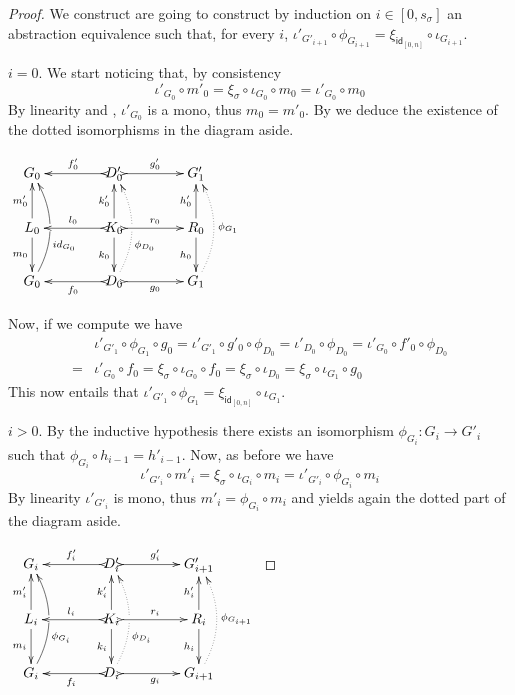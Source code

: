 \documentclass[a4paper,UKenglish,cleveref,pdftex,thm-restate,numberwithinsect,anonymous]{lipics}
\newcommand{\id}[1]{\mathsf{id}_{#1}}
\def\G{\textbf {\textup{G}}}
\begin{document}
\begin{proof}We construct are going to construct by induction on $i\in [0,s_\sigma]$ an abstraction equivalence such that, for every $i$, $\iota'_{G'_{i+1}}\circ \phi_{G_{i+1}}=\xi_{\id{[0,n]}}\circ \iota_{G_{i+1}}$.
	
	\smallskip \noindent \parbox{8.2cm}{$i=0$. We start noticing that, by consistency
		\[\iota'_{G_0}\circ m'_0=\xi_\sigma \circ \iota_{G_0}\circ m_0=\iota'_{G_0}\circ m_0\]
		By linearity and , $\iota'_{G_0}$ is a mono, thus $m_0=m'_0$. By   we deduce the existence of the dotted isomorphisms in the diagram aside.} \parbox{4cm}{\vspace{0ex}$\xymatrix@C=40pt{G_0&D'_0 \ar@{>->}[r]^{g'_0}
			\ar@{>->}[l]_{f'_0}&G'_{1}\\ L_0 \ar[u]^{m'_0} \ar[d]_{m_0}& K_0
			\ar[u]^{k'_0} \ar[d]_{k_0} \ar@{>->}[r]^{r_0} \ar@{>->}[l]_{l_0}
			&R_0\ar[u]^{h'_0} \ar[d]_{h_0}\\G_0
			\ar@/_.45cm/[uu]_(.35){\id{G_0}}|\hole& D_0 \ar@{>->}[l]^{f_0}  \ar@{.>}@/_.45cm/[uu]_(.35){\phi_{D_0}}|\hole
			\ar@{>->}[r]_{g_0}& G_{1}\ar@{.>}@/_.45cm/[uu]_{\phi_{G_1}}}$}
	
	Now, if we compute we have
	\begin{align*}
		&\iota'_{G'_1}\circ \phi_{G_1}\circ g_0=\iota'_{G'_1}\circ g'_0\circ \phi_{D_0}=\iota'_{D_0}\circ \phi_{D_0}=\iota'_{G_0}\circ f'_0\circ \phi_{D_0}\\=&\iota'_{G_0}\circ f_0=\xi_{\sigma} \circ \iota_{G_0}\circ  f_0=\xi_{\sigma} \circ \iota_{D_0}=\xi_{\sigma} \circ \iota_{G_1}\circ g_0 
	\end{align*}
	This now entails that $\iota'_{G'_1}\circ \phi_{G_1}=\xi_{\id{[0,n]}}\circ \iota_{G_1}$.
	
	
	\smallskip  \noindent \parbox{7.5cm}{$i>0$. By the inductive hypothesis there exists an isomorphism $\phi_{G_{i}}\colon G_{i}\to G'_i$ such that $\phi_{G_{i}}\circ h_{i-1}=h'_{i-1}$. Now, as before we have
		\[\iota'_{G'_{i}}\circ m'_{i}=\xi_{\sigma}\circ \iota_{G_i}\circ m_{i}=\iota'_{G'_{i}}\circ \phi_{G_{i}} \circ m_i \]
		By linearity $\iota'_{G'_{i}}$ is mono, thus $m'_i=\phi_{G_{i}} \circ m_i$ and  yields again the dotted part of the diagram aside.}
	\parbox{4cm}{\vspace{-2em}$\xymatrix@C=40pt{G_i&D'_i \ar@{>->}[r]^{g'_i}
			\ar@{>->}[l]_{f'_i}&G'_{i+1}\\ L_i \ar[u]^{m'_i} \ar[d]_{m_i}& K_i
			\ar[u]^{k'_i} \ar[d]_{k_i} \ar@{>->}[r]^{r_i} \ar@{>->}[l]_{l_i}
			&R_i\ar[u]^{h'_i} \ar[d]_{h_i}\\G_i
			\ar@/_.45cm/[uu]_(.35){\phi_{G_i}}|\hole& D_i \ar@{>->}[l]^{f_i}  \ar@{.>}@/_.45cm/[uu]_(.35){\phi_{D_i}}|\hole
			\ar@{>->}[r]_{g_i}& G_{i+1}\ar@{.>}@/_.45cm/[uu]_{\phi_{G_{i+1}}}}$}
	

\end{proof}
\end{document}
